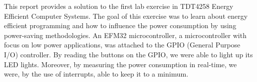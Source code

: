 This report provides a solution to the first lab exercise in TDT4258 Energy Efficient Computer Systems. The goal of this exercise was to learn about energy efficient programming and how to influence the power consumption by using power-saving methodologies. An EFM32 microcontroller, a microcontroller with focus on low power applications, was attached to the GPIO (General Purpose I/O) controller. By reading the buttons on the GPIO, we were able to light up its LED lights. Moreover, by measuring the power consumption in real-time, we were, by the use of interrupts, able to keep it to a minimum.
